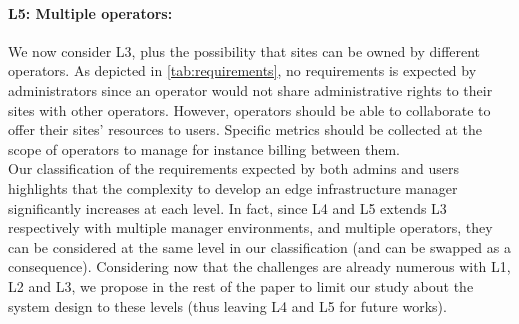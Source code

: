 \paragraph{L5: Multiple operators:}
We now consider L3, plus the possibility that sites can be owned by different
operators. As depicted in \cref{tab:requirements}, no requirements is expected
by administrators since an operator would not share administrative rights to
their sites with other operators. However,
operators should be able to collaborate to offer their sites' resources to
users. Specific metrics should be collected at the scope of operators to
manage for instance billing between them.\\

Our classification of the requirements expected by both admins and users
highlights that the complexity to develop an edge infrastructure manager
significantly increases at each level. In fact, since L4 and L5 extends L3
respectively with multiple manager environments, and multiple operators, they
can be considered at the same level in our classification (and can be swapped
as a consequence).
Considering now that the challenges are already numerous with L1, L2 and L3, we
propose in the rest of the paper to limit our study about the system design to
these levels (thus leaving L4 and L5 for future works).

